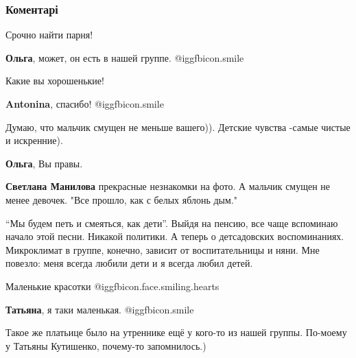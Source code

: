  
 
 
 
 
\subsubsection{Коментарі}
\label{sec:20_11_2021.fb.fb_group.story_kiev_ua.2.malenkaja_podolskaja_devochka.cmt}

\begin{itemize} %
Срочно найти парня!

\textbf{Ольга}, может, он есть в нашей группе. @igg{fbicon.smile} 

Какие вы хорошенькие!

\textbf{Antonina}, спасибо! @igg{fbicon.smile} 

Думаю, что мальчик смущен не меньше вашего)). Детские чувства -самые чистые и искренние).

\begin{itemize} %
\textbf{Ольга}, Вы правы.

\textbf{Светлана Манилова} прекрасные незнакомки на фото. А мальчик смущен не менее девочек. "Все прошло, как с белых яблонь дым."
\end{itemize} %


\enquote{Мы будем петь и смеяться, как дети}. Выйдя на пенсию, все чаще вспоминаю
начало этой песни. Никакой политики. А теперь о детсадовских воспоминаниях.
Микроклимат в группе, конечно, зависит от воспитательницы и няни. Мне повезло:
меня всегда любили дети и я всегда любил детей.

Маленькие красотки @igg{fbicon.face.smiling.hearts} 

\textbf{Татьяна}, я таки маленькая. @igg{fbicon.smile} 

Такое же платьице было на утреннике ещё у кого-то из нашей группы. По-моему у
Татьяны Кутишенко, почему-то запомнилось.)


\end{itemize}
